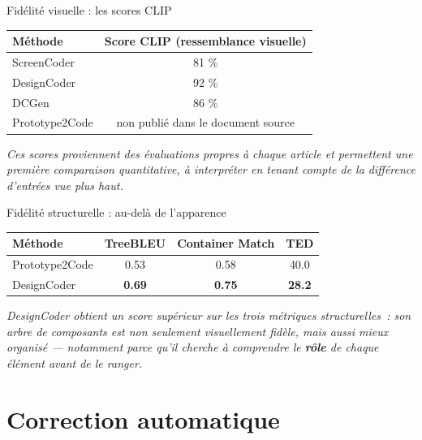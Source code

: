 \documentclass[11pt]{beamer}
\begin{document}
\begin{frame}{Fidélité visuelle : les scores CLIP}
\begin{center}
\small
\begin{tabular}{lc}
\toprule
\textbf{Méthode} & \textbf{Score CLIP (ressemblance visuelle)} \\
\midrule
ScreenCoder & 81 \% \\
DesignCoder & 92 \% \\
DCGen & 86 \% \\
Prototype2Code & non publié dans le document source \\
\bottomrule
\end{tabular}
\end{center}
\vspace{0.3cm}
\small\textit{Ces scores proviennent des évaluations propres à chaque article et permettent une première comparaison quantitative, à interpréter en tenant compte de la différence d'entrées vue plus haut.}
\end{frame}

\begin{frame}{Fidélité structurelle : au-delà de l'apparence}
\begin{center}
\small
\begin{tabular}{lccc}
\toprule
\textbf{Méthode} & \textbf{TreeBLEU} & \textbf{Container Match} & \textbf{TED} \\
\midrule
Prototype2Code & 0.53 & 0.58 & 40.0 \\
DesignCoder & \textbf{0.69} & \textbf{0.75} & \textbf{28.2} \\
\bottomrule
\end{tabular}
\end{center}
\vspace{0.3cm}
\small\textit{DesignCoder obtient un score supérieur sur les trois métriques structurelles~: son arbre de composants est non seulement visuellement fidèle, mais aussi mieux organisé --- notamment parce qu'il cherche à comprendre le \textbf{rôle} de chaque élément avant de le ranger.}
\end{frame}

\section{Correction automatique}
\end{document}
